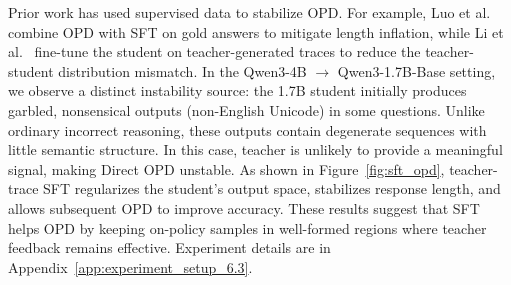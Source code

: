 Prior work has used supervised data to stabilize OPD. For example, Luo et al.~\cite{luo2026demystifying} combine OPD with SFT on gold answers to mitigate length inflation, while Li et al.~\cite{li2026rethinkingonpolicydistillationlarge} fine-tune the student on teacher-generated traces to reduce the teacher-student distribution mismatch. In the Qwen3-4B $\rightarrow$ Qwen3-1.7B-Base setting, we observe a distinct instability source: the 1.7B student initially produces garbled, nonsensical outputs (non-English Unicode) in some questions. Unlike ordinary incorrect reasoning, these outputs contain degenerate sequences with little semantic structure. In this case, teacher is unlikely to provide a meaningful signal, making Direct OPD unstable. As shown in Figure~\ref{fig:sft_opd}, teacher-trace SFT regularizes the student's output space, stabilizes response length, and allows subsequent OPD to improve accuracy. These results suggest that SFT helps OPD by keeping on-policy samples in well-formed regions where teacher feedback remains effective. Experiment details are in Appendix~\ref{app:experiment_setup_6.3}.